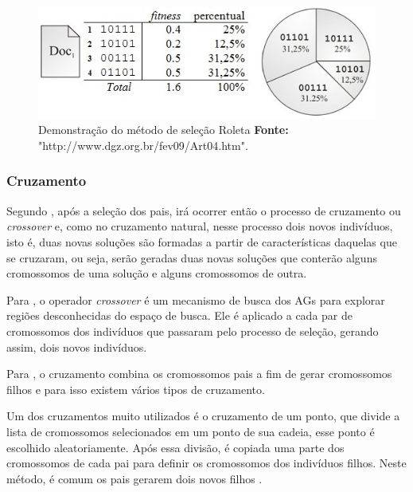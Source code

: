 \begin{figure}[h!]
	\centerline{\includegraphics[scale=1.0]{./imagens/roleta.jpg}}
	\caption[Demonstração do método de seleção Roleta]
	{Demonstração do método de seleção Roleta \textbf{Fonte:}
	"http://www.dgz.org.br/fev09/Art04.htm".}
	\label{fig:metodo_selecao_roleta}
\end{figure}



\subsubsection{Cruzamento} 

\par Segundo , após a seleção dos pais, irá
ocorrer então o processo de cruzamento ou \textit{crossover} e, como no cruzamento natural, 
nesse processo dois novos indivíduos, isto é, duas novas soluções são formadas a partir de 
características daquelas que se cruzaram, ou seja, serão geradas duas novas soluções que conterão 
alguns cromossomos de uma solução e alguns cromossomos de outra.

\par Para , o operador
\textit{crossover} é um mecanismo de busca dos AGs para explorar regiões
desconhecidas do espaço de busca. Ele é aplicado a cada par de cromossomos dos
indivíduos que passaram pelo processo de seleção, gerando assim, dois novos
indivíduos.

\par Para , o cruzamento combina
os cromossomos pais a fim de gerar cromossomos filhos e para isso existem vários
tipos de cruzamento.

\par Um dos cruzamentos muito utilizados é o cruzamento de um ponto, que divide a
lista de cromossomos selecionados em um ponto de sua cadeia, esse ponto é escolhido aleatoriamente.
Após essa divisão, é copiada uma parte dos cromossomos de cada pai para definir
os cromossomos dos indivíduos filhos. Neste método, é comum os pais gerarem dois
novos filhos \cite{REVISTA_MULTIDISCIPLINAR_DA_UNIESP}.

